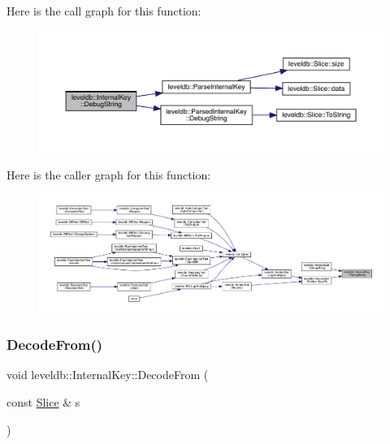Here is the call graph for this function\+:
\nopagebreak
\begin{figure}[H]
\begin{center}
\leavevmode
\includegraphics[width=350pt]{classleveldb_1_1_internal_key_ad5812d3c90842906266e50b5a5911f84_cgraph}
\end{center}
\end{figure}
Here is the caller graph for this function\+:
\nopagebreak
\begin{figure}[H]
\begin{center}
\leavevmode
\includegraphics[width=350pt]{classleveldb_1_1_internal_key_ad5812d3c90842906266e50b5a5911f84_icgraph}
\end{center}
\end{figure}
\mbox{\label{classleveldb_1_1_internal_key_a5a8c9bced0ba968b6b62d91cfb19a82a}} 
\subsubsection{\texorpdfstring{DecodeFrom()}{DecodeFrom()}}
{\footnotesize\ttfamily void leveldb\+::\+Internal\+Key\+::\+Decode\+From (\begin{DoxyParamCaption}\item[{const \mbox{\hyperlink{classleveldb_1_1_slice}{Slice}} \&}]{s }\end{DoxyParamCaption})\hspace{0.3cm}{\ttfamily [inline]}}


